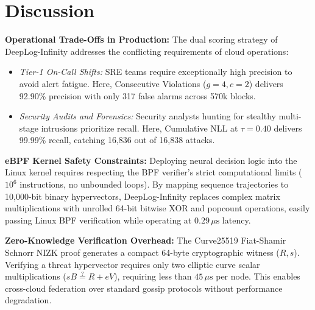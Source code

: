 \documentclass[letterpaper,twocolumn,10pt]{article}
\begin{document}
\section{Discussion}
\label{sec:discussion}
\textbf{Operational Trade-Offs in Production:} The dual scoring strategy of DeepLog-Infinity addresses the conflicting requirements of cloud operations:
\begin{itemize}[leftmargin=*]
    \item \textit{Tier-1 On-Call Shifts:} SRE teams require exceptionally high precision to avoid alert fatigue. Here, Consecutive Violations ($g=4, c=2$) delivers 92.90\% precision with only 317 false alarms across 570k blocks.
    \item \textit{Security Audits and Forensics:} Security analysts hunting for stealthy multi-stage intrusions prioritize recall. Here, Cumulative NLL at $\tau = 0.40$ delivers 99.99\% recall, catching 16,836 out of 16,838 attacks.
\end{itemize}

\noindent\textbf{eBPF Kernel Safety Constraints:} Deploying neural decision logic into the Linux kernel requires respecting the BPF verifier's strict computational limits ($10^6$ instructions, no unbounded loops). By mapping sequence trajectories to 10,000-bit binary hypervectors, DeepLog-Infinity replaces complex matrix multiplications with unrolled 64-bit bitwise XOR and popcount operations, easily passing Linux BPF verification while operating at $0.29\,\mu\text{s}$ latency.

\noindent\textbf{Zero-Knowledge Verification Overhead:} The Curve25519 Fiat-Shamir Schnorr NIZK proof generates a compact 64-byte cryptographic witness ($R, s$). Verifying a threat hypervector requires only two elliptic curve scalar multiplications ($s B \stackrel{?}{=} R + e V$), requiring less than $45\,\mu\text{s}$ per node. This enables cross-cloud federation over standard gossip protocols without performance degradation.

\end{document}
